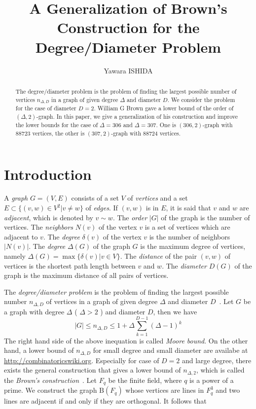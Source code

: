 \documentclass{article}
\title{A Generalization of Brown's Construction for the Degree/Diameter Problem}
\author{Yawara ISHIDA}
\newcommand{\B}{\mathrm{B}}
\begin{document}
\maketitle
\begin{abstract}
The degree/diameter problem is the problem of finding the largest possible number of vertices $n_{\Delta,D}$ in a graph of given degree $\Delta$ and diameter $D$.
We consider the problem for the case of diameter $D=2$.
William G Brown gave a lower bound of the order of $(\Delta,2)$-graph.
In this paper, we give a generalization of his construction and improve the lower bounds for the case of $\Delta=306$ and $\Delta=307$.
One is $(306,2)$-graph with $88723$ vertices, the other is $(307,2)$-graph with $88724$ vertices.
\end{abstract}

\section{Introduction}
A {\it graph} $G=(V,E)$ consists of a set $V$ of {\it vertices} and a set $E \subset \{(v,w) \in V^2 | v \neq w \}$ of {\it edges}.
If $(v,w)$ is in $E$, it is said that $v$ and $w$ are {\it adjacent}, which is denoted by $v \sim w$.
The {\it order} $|G|$ of the graph is the number of vertices. 
The {\it neighbors} $N(v)$ of the vertex $v$ is a set of vertices which are adjacent to $v$.
The {\it degree} $\delta(v)$ of the vertex $v$ is the number of neighbors $| N(v) |$.  
The {\it degree} $\Delta(G)$ of the graph $G$ is the maximum degree of vertices, namely $\Delta(G)=\max\{\delta(v)|v\in V\}$.
The {\it distance} of the pair $(v,w)$ of vertices is the shortest path length between $v$ and $w$. 
The {\it diameter} $D(G)$ of the graph is the  maximum distance of all pairs of vertices.

The {\it degree/diameter problem} is the problem of finding the largest possible number  $n_{\Delta,D}$ of vertices in a graph of given degree $\Delta$ and diameter $D$~\cite{MilSir2005, brown1966graphs}. 
Let $G$ be a graph with degree $\Delta$ ( $\Delta > 2$ ) and diameter $D$, then we have 
\[ |G| \leq n_{\Delta,D} \leq 1 + \Delta \sum_{k=1}^{D-1} (\Delta - 1)^k\]
The right hand side of the above inequation is called {\it Moore bound}.
On the other hand, a lower bound of $n_{\Delta,D}$ for small degree and small diameter are availabe at \url{http://combinatoricswiki.org}. 
Especially for case of $D=2$ and large degree, there exists the general construction that gives a lower bound of $n_{\Delta,2}$, which is called the {\it Brown's construction}~\cite{MilSir2005}.
Let $F_q$ be the finite field, where $q$ is a power of a prime.
We construct the graph $\B(F_q)$ whose vertices are lines in $F_q^3$ and two lines are adjacent if and only if they are orthogonal. 
It follows that
\end{document}
